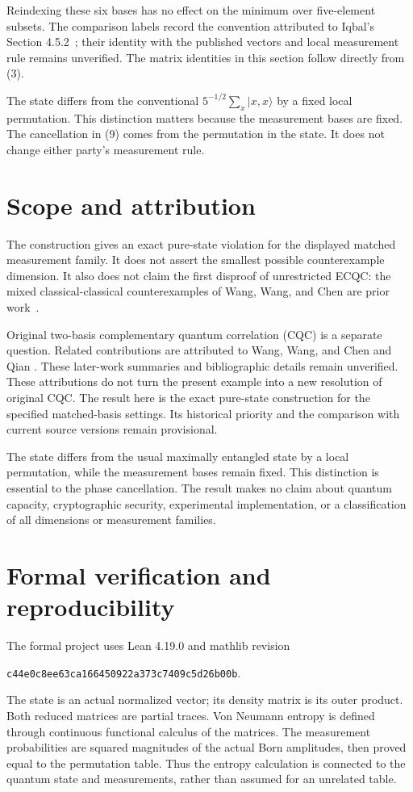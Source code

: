 \documentclass[11pt,a4paper]{article}
\begin{document}
Reindexing these six bases has no effect on the minimum over five-element
subsets. The comparison labels record the convention attributed to
Iqbal's Section 4.5.2~\cite{Iqbal}; their identity with the published
vectors and local measurement rule remains unverified. The matrix
identities in this section follow directly from (3).

The state differs from the conventional \(5^{-1/2}\sum_x|x,x\rangle\) by
a fixed local permutation. This distinction matters because the
measurement bases are fixed. The cancellation in (9) comes from the
permutation in the state. It does not change either party's measurement
rule.

\section{Scope and attribution}
The construction gives an exact pure-state violation for the displayed
matched measurement family. It does not assert the smallest possible
counterexample dimension. It also does not claim the first disproof of
unrestricted ECQC: the mixed classical-classical counterexamples of
Wang, Wang, and Chen are prior work~\cite{WangECQC}.

Original two-basis complementary quantum correlation (CQC) is a separate
question. Related contributions are attributed to Wang, Wang, and Chen
\cite{WangQubits} and Qian \cite{Qian}. These later-work summaries and
bibliographic details remain unverified. These attributions do not turn the present example into a new
resolution of original CQC. The result here is the exact
pure-state construction for the specified matched-basis settings. Its historical
priority and the comparison with current source versions remain provisional.

The state differs from the usual maximally entangled state by a local
permutation, while the measurement bases remain fixed. This distinction
is essential to the phase cancellation. The result makes no claim about
quantum capacity, cryptographic security, experimental implementation,
or a classification of all dimensions or measurement families.

\section{Formal verification and reproducibility}\label{sec:formal}
The formal project uses Lean 4.19.0 and mathlib revision
\begin{center}
\texttt{\small c44e0c8ee63ca166450922a373c7409c5d26b00b}.
\end{center}
The state is an actual normalized vector; its density matrix is its outer
product. Both reduced matrices are partial traces. Von Neumann entropy
is defined through continuous functional calculus of the matrices.
The measurement probabilities are squared magnitudes of the actual Born
amplitudes, then proved equal to the permutation table. Thus the entropy
calculation is connected to the quantum state and measurements, rather
than assumed for an unrelated table.
\end{document}

